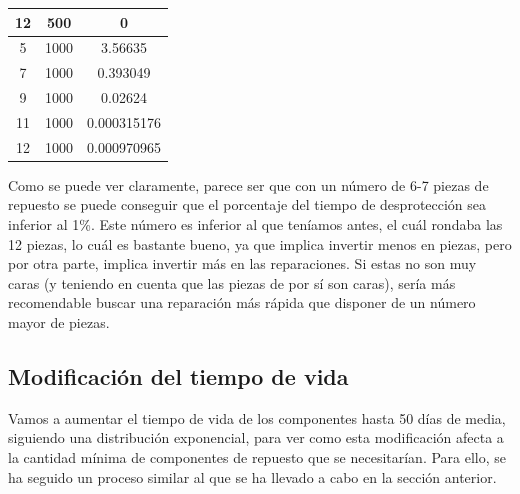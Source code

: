 \documentclass[11pt,a4paper]{report}
\begin{document}
\begin{table}[H]
\begin{tabular}{c|c|c}
12                                                                       & 500                         & 0                                                                                          \\ \hline
5                                                                        & 1000                        & 3.56635                                                                                    \\
7                                                                        & 1000                        & 0.393049                                                                                   \\
9                                                                        & 1000                        & 0.02624                                                                                    \\
11                                                                       & 1000                        & 0.000315176                                                                                \\
12                                                                       & 1000                        & 0.000970965                                                                               
\end{tabular}
\end{table}

Como se puede ver claramente, parece ser que con un número de 6-7 piezas de repuesto se puede conseguir que el porcentaje
del tiempo de desprotección sea inferior al 1\%. Este número es inferior al que teníamos antes, el cuál rondaba las 12 piezas,
lo cuál es bastante bueno, ya que implica invertir menos en piezas, pero por otra parte, implica invertir más en las reparaciones.
Si estas no son muy caras (y teniendo en cuenta que las piezas de por sí son caras), sería más recomendable buscar
una reparación más rápida que disponer de un número mayor de piezas.

\subsection{Modificación del tiempo de vida}

Vamos a aumentar el tiempo de vida de los componentes hasta 50 días de media, siguiendo una distribución exponencial, para
ver como esta modificación afecta a la cantidad mínima de componentes de repuesto que se necesitarían. Para ello, se ha
seguido un proceso similar al que se ha llevado a cabo en la sección anterior.
\end{document}
